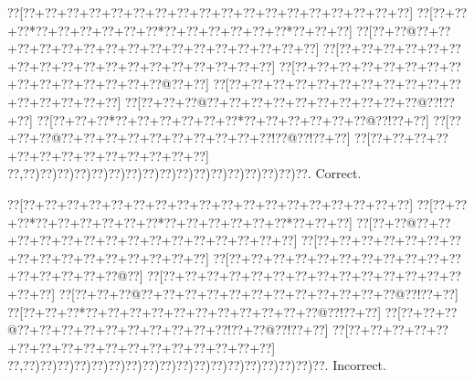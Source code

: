\documentclass[a5paper]{article}
\begin{document}
\begin{center}
{\goo
\0??[\0??+\0??+\0??+\0??+\0??+\0??+\0??+\0??+\0??+\0??+\0??+\0??+\0??+\0??+\0??+\0??+\0??+\0??]
\0??[\0??+\0??+\0??*\0??+\0??+\0??+\0??+\0??+\0??*\0??+\0??+\0??+\0??+\0??+\0??*\0??+\0??+\0??]
\0??[\0??+\0??@\0??+\0??+\0??+\0??+\0??+\0??+\0??+\0??+\0??+\0??+\0??+\0??+\0??+\0??+\0??+\0??]
\0??[\0??+\0??+\0??+\0??+\0??+\0??+\0??+\0??+\0??+\0??+\0??+\0??+\0??+\0??+\0??+\0??+\0??+\0??]
\0??[\0??+\0??+\0??+\0??+\0??+\0??+\0??+\0??+\0??+\0??+\0??+\0??+\0??+\0??+\0??@\0??+\0??]
\0??[\0??+\0??+\0??+\0??+\0??+\0??+\0??+\0??+\0??+\0??+\0??+\0??+\0??+\0??+\0??+\0??]
\0??[\0??+\0??+\0??@\0??+\0??+\0??+\0??+\0??+\0??+\0??+\0??+\0??+\0??@\0??!\0??+\0??]
\0??[\0??+\0??+\0??*\0??+\0??+\0??+\0??+\0??+\0??*\0??+\0??+\0??+\0??+\0??+\0??@\0??!\0??+\0??]
\0??[\0??+\0??+\0??@\0??+\0??+\0??+\0??+\0??+\0??+\0??+\0??+\0??+\0??!\0??@\0??!\0??+\0??]
\0??[\0??+\0??+\0??+\0??+\0??+\0??+\0??+\0??+\0??+\0??+\0??+\0??+\0??]
\0??,\0??)\0??)\0??)\0??)\0??)\0??)\0??)\0??)\0??)\0??)\0??)\0??)\0??)\0??)\0??)\0??)\0??.
}
Correct. 

\end{center}
\begin{center}
{\goo
\0??[\0??+\0??+\0??+\0??+\0??+\0??+\0??+\0??+\0??+\0??+\0??+\0??+\0??+\0??+\0??+\0??+\0??+\0??]
\0??[\0??+\0??+\0??*\0??+\0??+\0??+\0??+\0??+\0??*\0??+\0??+\0??+\0??+\0??+\0??*\0??+\0??+\0??]
\0??[\0??+\0??@\0??+\0??+\0??+\0??+\0??+\0??+\0??+\0??+\0??+\0??+\0??+\0??+\0??+\0??+\0??]
\0??[\0??+\0??+\0??+\0??+\0??+\0??+\0??+\0??+\0??+\0??+\0??+\0??+\0??+\0??+\0??+\0??]
\0??[\0??+\0??+\0??+\0??+\0??+\0??+\0??+\0??+\0??+\0??+\0??+\0??+\0??+\0??+\0??+\0??@\0??]
\0??[\0??+\0??+\0??+\0??+\0??+\0??+\0??+\0??+\0??+\0??+\0??+\0??+\0??+\0??+\0??+\0??]
\0??[\0??+\0??+\0??@\0??+\0??+\0??+\0??+\0??+\0??+\0??+\0??+\0??+\0??+\0??+\0??@\0??!\0??+\0??]
\0??[\0??+\0??+\0??*\0??+\0??+\0??+\0??+\0??+\0??+\0??+\0??+\0??+\0??+\0??@\0??!\0??+\0??]
\0??[\0??+\0??+\0??@\0??+\0??+\0??+\0??+\0??+\0??+\0??+\0??+\0??+\0??!\0??+\0??@\0??!\0??+\0??]
\0??[\0??+\0??+\0??+\0??+\0??+\0??+\0??+\0??+\0??+\0??+\0??+\0??+\0??+\0??+\0??+\0??+\0??]
\0??,\0??)\0??)\0??)\0??)\0??)\0??)\0??)\0??)\0??)\0??)\0??)\0??)\0??)\0??)\0??)\0??)\0??)\0??.
}
Incorrect. 

\end{center}
\newpage
\end{document}
